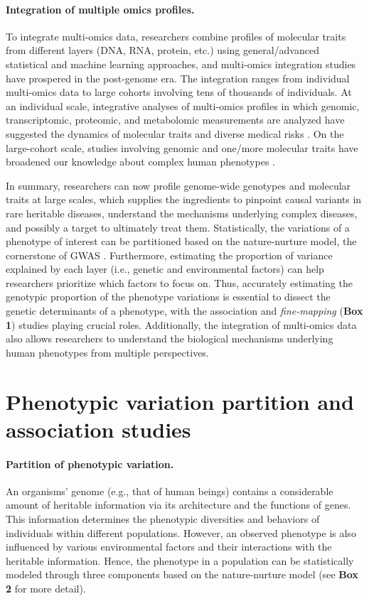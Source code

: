 \documentclass{book}
\begin{document}
\begin{refsection}
\paragraph*{Integration of multiple omics profiles.} To integrate multi-omics data, researchers combine profiles of molecular traits from different layers (DNA, RNA, protein, etc.) using general/advanced statistical and machine learning approaches, and multi-omics integration studies have prospered in the post-genome era.
The integration ranges from individual multi-omics data to large cohorts involving tens of thousands of individuals.
At an individual scale, integrative analyses of multi-omics profiles in which genomic, transcriptomic, proteomic, and metabolomic measurements are analyzed have suggested the dynamics of molecular traits and diverse medical risks \cite{Chen2012Personal}.
On the large-cohort scale, studies involving genomic and one/more molecular traits have broadened our knowledge about complex human phenotypes \cite{Karczewski2018Integrative,Ritchie2015Methods}.

In summary, researchers can now profile genome-wide genotypes and molecular traits at large scales, which supplies the ingredients to pinpoint causal variants in rare heritable diseases, understand the mechanisms underlying complex diseases, and possibly a target to ultimately treat them.
Statistically, the variations of a phenotype of interest can be partitioned based on the nature-nurture model, the cornerstone of GWAS \cite{Visscher2008Heritability}.
Furthermore, estimating the proportion of variance explained by each layer (i.e., genetic and environmental factors) can help researchers prioritize which factors to focus on.
Thus, accurately estimating the genotypic proportion of the phenotype variations is essential to dissect the genetic determinants of a phenotype, with the association and \textit{fine-mapping} (\textbf{Box 1}) studies playing crucial roles.
Additionally, the integration of multi-omics data also allows researchers to understand the biological mechanisms underlying human phenotypes from multiple perspectives.

\section*{Phenotypic variation partition and association studies}
\paragraph*{Partition of phenotypic variation.} An organisms' genome (e.g., that of human beings) contains a considerable amount of heritable information via its architecture and the functions of genes.
This information determines the phenotypic diversities and behaviors of individuals within different populations.
However, an observed phenotype is also influenced by various environmental factors and their interactions with the heritable information.
Hence, the phenotype in a population can be statistically modeled through three components based on the nature-nurture model (see \textbf{Box 2} for more detail).


\end{refsection}
\end{document}
